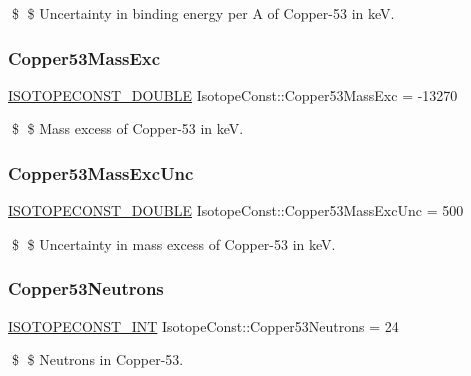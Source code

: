 \$ \$ Uncertainty in binding energy per A of Copper-\/53 in keV. \mbox{\label{group___isotope_const-_copper-_cu53_gab3c33ca7c164b436fbfc36dccc948ac1}} 
\subsubsection{\texorpdfstring{Copper53\+Mass\+Exc}{Copper53MassExc}}
{\footnotesize\ttfamily \mbox{\hyperlink{group___isotope_const-_macros_ga8f45a7272ce02c0b4c65c44636ed719a}{I\+S\+O\+T\+O\+P\+E\+C\+O\+N\+S\+T\+\_\+\+D\+O\+U\+B\+LE}} Isotope\+Const\+::\+Copper53\+Mass\+Exc = -\/13270}

\$ \$ Mass excess of Copper-\/53 in keV. \mbox{\label{group___isotope_const-_copper-_cu53_gae737f8b9c511a253353d0537cb436ed8}} 
\subsubsection{\texorpdfstring{Copper53\+Mass\+Exc\+Unc}{Copper53MassExcUnc}}
{\footnotesize\ttfamily \mbox{\hyperlink{group___isotope_const-_macros_ga8f45a7272ce02c0b4c65c44636ed719a}{I\+S\+O\+T\+O\+P\+E\+C\+O\+N\+S\+T\+\_\+\+D\+O\+U\+B\+LE}} Isotope\+Const\+::\+Copper53\+Mass\+Exc\+Unc = 500}

\$ \$ Uncertainty in mass excess of Copper-\/53 in keV. \mbox{\label{group___isotope_const-_copper-_cu53_ga6fc643ff64812c6a11ae6a38c3fc6156}} 
\subsubsection{\texorpdfstring{Copper53\+Neutrons}{Copper53Neutrons}}
{\footnotesize\ttfamily \mbox{\hyperlink{group___isotope_const-_macros_ga5f18360b3e99483a35c32d789e62621c}{I\+S\+O\+T\+O\+P\+E\+C\+O\+N\+S\+T\+\_\+\+I\+NT}} Isotope\+Const\+::\+Copper53\+Neutrons = 24}

\$ \$ Neutrons in Copper-\/53. \mbox{\label{group___isotope_const-_copper-_cu53_gaf10d5da38e687f5d1d2cf6f2da9ad62c}} 
